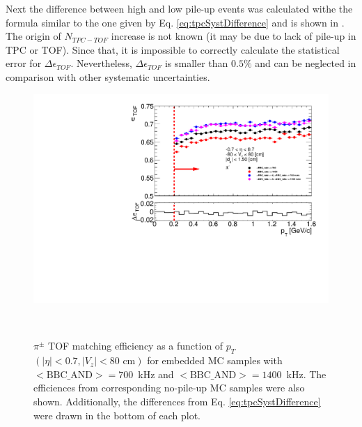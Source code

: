\noindent Next the difference between high and low pile-up events was calculated withe the formula similar to the one given by Eq. \ref{eq:tpcSystDifference} and is shown in . The origin of  $N_{TPC-TOF}$ increase is not known (it may be due to lack of pile-up in TPC or TOF). Since that, it is impossible to correctly calculate the statistical error for $\Delta\epsilon_{ TOF}$. Nevertheless, $\Delta\epsilon_{ TOF}$ is  smaller than $0.5\%$ and can be neglected in comparison with other systematic uncertainties.
\begin{figure}[hb]
	\caption[$\pi^\pm$ TOF matching efficiency as a function of $p_T$ $\left(|\eta|<0.7, |V_z|<80\text{ cm}\right)$ for embedded MC samples with \mbox{$<\text{BBC\_AND}>=700$~kHz} and \mbox{$<\text{BBC\_AND}>=1400$~kHz}]{$\pi^\pm$ TOF matching efficiency as a function of $p_T$ $\left(|\eta|<0.7, |V_z|<80\text{ cm}\right)$ for embedded MC samples with \mbox{$<\text{BBC\_AND}>=700$~kHz} and \mbox{$<\text{BBC\_AND}>=1400$~kHz}. The efficiences from corresponding no-pile-up MC samples were also shown. Additionally, the differences  from Eq. \ref{eq:tpcSystDifference} were drawn in the bottom of each plot.}
	\label{fig:systError1Dtof}
	\centering
	\parbox{0.495\textwidth}{
		\centering
		\includegraphics[width=\linewidth,page=1]{graphics/systematicsEfficiency/bbc_and/tofEffi_d0_1_5_etapt_1.pdf}\\
	}~
	\parbox{0.495\textwidth}{
		\centering
}
\end{figure}
